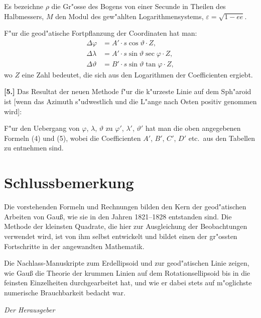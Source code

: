 \documentclass[12pt,a4paper]{article}
\theoremstyle{plain}
\theoremstyle{definition}
\theoremstyle{remark}
\begin{document}
Es bezeichne $\rho$ die Gr"osse des Bogens von einer Secunde in Theilen
des Halbmessers, $M$ den Modul des gew"ahlten Logarithmensystems,
$\varepsilon = \sqrt{1 - ee}$.

F"ur die geod"atische Fortpflanzung der Coordinaten hat man:
\begin{align*}
\Delta\varphi &= A'\cdot s\cos\vartheta\cdot Z, \\
\Delta\lambda &= A'\cdot s\sin\vartheta\sec\varphi\cdot Z, \\
\Delta\vartheta &= B'\cdot s\sin\vartheta\tan\varphi\cdot Z,
\end{align*}
wo $Z$ eine Zahl bedeutet, die sich aus den Logarithmen der Coefficienten
ergiebt.

\textbf{[5.]} Das Resultat der neuen Methode f"ur die k"urzeste Linie auf dem Sph"aroid ist [wenn das Azimuth s"udwestlich und die L"ange nach Osten positiv genommen wird]:

F"ur den Uebergang von $\varphi$, $\lambda$, $\vartheta$ zu $\varphi'$, $\lambda'$, $\vartheta'$
hat man die oben angegebenen Formeln (4) und (5), wobei die
Coefficienten $A'$, $B'$, $C'$, $D'$ etc.\ aus den Tabellen zu entnehmen sind.

\section*{Schlussbemerkung}

Die vorstehenden Formeln und Rechnungen bilden den Kern der
geod"atischen Arbeiten von Gau\ss{}, wie sie in den Jahren 1821--1828
entstanden sind. Die Methode der kleinsten Quadrate, die hier zur
Ausgleichung der Beobachtungen verwendet wird, ist von ihm selbst
entwickelt und bildet einen der gr"ossten Fortschritte in der
angewandten Mathematik.

Die Nachlass-Manuskripte zum Erdellipsoid und zur geod"atischen
Linie zeigen, wie Gau\ss{} die Theorie der krummen Linien auf dem
Rotationsellipsoid bis in die feinsten Einzelheiten durchgearbeitet
hat, und wie er dabei stets auf m"oglichste numerische
Brauchbarkeit bedacht war.

\vspace{2em}
\begin{flushright}
\textit{Der Herausgeber}
\end{flushright}
\end{document}

